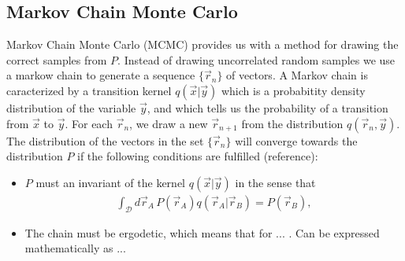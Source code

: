 \documentclass[a4paper,10pt,twocolumn]{article} %
\begin{document}
\subsection{Markov Chain Monte Carlo}%

Markov Chain Monte Carlo (MCMC) provides us with a method for drawing the correct samples from $P$. 
Instead of drawing uncorrelated random samples we use a markow chain to generate a sequence $\{\vec r_n\}$ of vectors.
A Markov chain is caracterized by a transition kernel $q(\vec x|\vec y)$ which is a probabitity density distribution 
of the variable $\vec y$, and which tells us the probability of a transition from $\vec x$ to $\vec y$.
For each $\vec r_n$, we draw a new $\vec r_{n+1}$ from the distribution $q(\vec r_n,\vec y)$. The distribution 
of the vectors in the set 
$\{\vec r_n\}$ will converge towards the distribution $P$ if the following 
conditions are fulfilled (reference):
\begin{itemize}
\item
	$P$ must an invariant of the kernel $q(\vec x|\vec y)$ in the sense that 
	\begin{align}
	\int_{\mathcal D} d\vec r_A\, P(\vec r_A) q(\vec r_A | \vec r_B) = P(\vec r_B) \label{eq221},
	\end{align}
\item
	The chain must be ergodetic, which means that for ... . Can be expressed mathematically as ...
\end{itemize}
\end{document}
